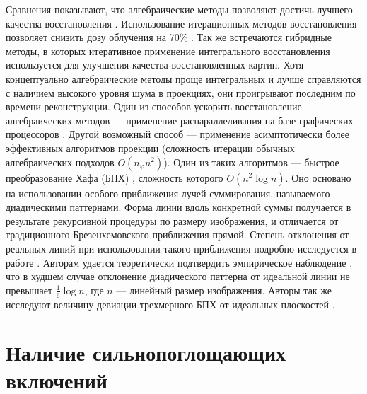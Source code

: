 Сравнения показывают, что алгебраические методы позволяют достичь лучшего качества восстановления \cite{sirt_less_artifacts, Lucas_sota_ir_survey_2015_radiology}.
Использование итерационных методов восстановления позволяет снизить дозу облучения на 70\% \cite{Willemink2013}.
Так же встречаются гибридные методы, в которых итеративное применение интегрального восстановления используется для улучшения качества восстановленных картин.
Хотя концептуально алгебраические методы проще интегральных и лучше справляются с наличием высокого уровня шума в проекциях, они проигрывают последним по времени реконструкции.
Один из способов ускорить восстановление алгебраических методов --- применение распараллеливания на базе графических процессоров \cite{buz2011cuda}.
Другой возможный способ --- применение асимптотически более эффективных алгоритмов проекции (сложность итерации обычных алгебраических подходов $O(n_\varphi n^2)$).
Один из таких алгоритмов --- быстрое преобразование Хафа (БПХ) \cite{Brady1998, hough}, сложность которого $O(n^2 \log n)$.
Оно основано на использовании особого приближения лучей суммирования, называемого диадическими паттернами.
Форма линии вдоль конкретной суммы получается в результате рекурсивной процедуры по размеру изображения, и отличается от традиционного Брезенхемовского приближения прямой.
Степень отклонения от реальных линий при использовании такого приближения подробно исследуется в работе \cite{ershov2015dyadic}.
Авторам удается теоретически подтвердить эмпирическое наблюдение \cite{Brady1998}, что в худшем случае отклонение диадического паттерна от идеальной линии не превышает $\frac 1 6 \log n$, где $n$ --- линейный размер изображения.
Авторы так же исследуют величину девиации трехмерного БПХ от идеальных плоскостей \cite{ershov3DHough}.

\section{Наличие сильнопоглощающих включений}

